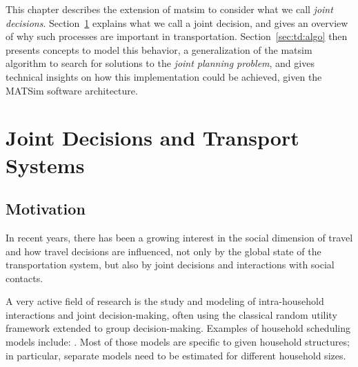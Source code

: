 { %
\newcommand\insfig[2]{%
	\insfigwidth{#1}{#2}{.8\textwidth}
}
\newcommand\insfigwidth[3]{%
\createfigure{#1}{#1}{}{%
		\texttt{[image: extending/figures/Jointtrips/\#2]}%
		}{}%
}

\newcommand\inssubfigwidth[3]{%
\createsubfigure{#2}{%
		\texttt{[image: extending/figures/Jointtrips/\#3]}%
		}{}{\quad}%
}
\newcommand\inssubfig[2]{%
\inssubfigwidth{.46\textwidth}{#1}{#2}%
}
\newcommand\insfigwithsubfigs[2]{%
\createfigure{#1}{#1}{}{%
		#2%
		}{}%
}

This chapter describes the extension of \gls{matsim} to consider what we call \emph{joint decisions}. Section~\ref{sec:td:intro} explains what we call a joint decision, and gives an overview of why such processes
are important in transportation. Section~\ref{sec:td:algo} then presents concepts to model this behavior, a generalization of the \gls{matsim} algorithm to search for solutions to the \emph{joint planning problem}, and gives technical insights on how this implementation could be achieved, given the MATSim software architecture.

\section{Joint Decisions and Transport Systems}
\label{sec:td:intro}
\subsection{Motivation}
In recent years, there has been a growing interest in the social dimension of travel and how travel decisions are influenced, not only by the global state of the transportation system, but also by joint decisions and interactions with social contacts.

A very active field of research is the study and modeling of intra-household interactions and joint decision-making, often using the classical random utility framework extended to group decision-making. Examples of household scheduling models include: \citet{ZhangEtAl_TransResB_2005, ZhangJEtAl_TRR_2007, KatoMatsumoto_TransResB_2009, BradleyVovsha_Transportation_2005, GliebeKoppelman_Transportation_2005,
GliebeKoppelman_Transportation_2002, HoCAndMulley_Transportation_2013, VovshaGupta_Transportation_2013}. Most of those models are specific to given household structures; in particular, separate models need to be estimated for different household sizes.

}
